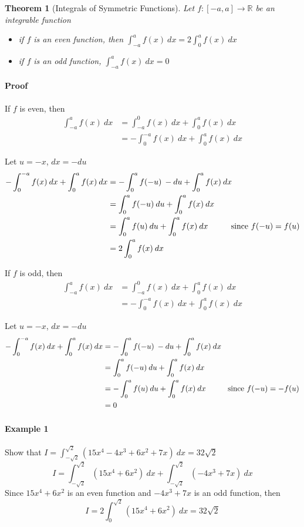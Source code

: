 \documentclass[12pt]{article}
\newcommand\tab[1][1cm]{\hspace*{#1}}
\newtheorem{theorem}{Theorem}
\begin{document}
\begin{theorem}[Integrals of Symmetric Functions]
     Let $f : [-a, a] \to \mathbb{R}$ be an integrable function
     \begin{itemize} 
        \item if $f$ is an even function, then $\int_{-a}^{a} f(x)\: dx = 2 \int_0^a f(x)\: dx$
        \item if $f$ is an odd function,  $\int_{-a}^{a} f(x)\: dx = 0$
    \end{itemize}
\end{theorem}
\paragraph{Proof}
If $f$ is even, then 
\begin{align*} 
    \int_{ - a}^{a} f(x)\: dx &= \int_{ - a}^0 f(x)\: dx + \int_0^a f(x)\: dx \\
    &= - \int_{0}^{ - a} f(x)\: dx + \int_0^a f(x)\: dx 
\end{align*}

Let $u = -x$, $dx = -du$
\begin{align*} 
    - \int_{0}^{ - a} f(x)\: dx + \int_0^a f(x)\: dx  &= - \int_{0}^{a} f( - u)\: - du + \int_0^a f(x)\: dx \\
    &= \int_{0}^{a} f( -u)\: du + \int_0^a f(x)\: dx  \\
    &= \int_{0}^{a} f(u)\: du + \int_0^a f(x)\: dx  \textrm{\tab since } f(-u) = f(u)\\
    &= 2\int_0^a f(x)\: dx\, 
\end{align*}

If $f$ is odd, then 
\begin{align*} 
    \int_{ - a}^{a} f(x)\: dx &= \int_{ - a}^0 f(x)\: dx + \int_0^a f(x)\: dx \\
    &= - \int_{0}^{ - a} f(x)\: dx + \int_0^a f(x)\: dx 
\end{align*}

Let $u = -x$, $dx = -du$
\begin{align*} 
    - \int_{0}^{ - a} f(x)\: dx + \int_0^a f(x)\: dx  &= - \int_{0}^{a} f( - u)\: - du + \int_0^a f(x)\: dx \\
    &= \int_{0}^{a} f( -u)\: du + \int_0^a f(x)\: dx  \\
    &= - \int_{0}^{a} f(u)\: du + \int_0^a f(x)\: dx  \textrm{\tab since } f(-u) = -f(u)\\
    &= 0 
\end{align*}

\paragraph{Example 1} Show that $I = \int_{-\sqrt{2}}^{\sqrt{2}} (15x^4 - 4x^3 + 6x^2 + 7x)\: dx = 32 \sqrt{2}$
\[
    I = \int_{-\sqrt{2}}^{\sqrt{2}} (15x^4 + 6x^2)\: dx + \int_{-\sqrt{2}}^{\sqrt{2}} ( - 4x^3 + 7x)\: dx
\]
Since $15x^4 + 6x^2$ is an even function and $ - 4x^3 + 7x$ is an odd function, then
\[
    I = 2 \int_{0}^{\sqrt{2}} (15x^4 + 6x^2)\: dx = 32 \sqrt{2}
\]
\end{document}
